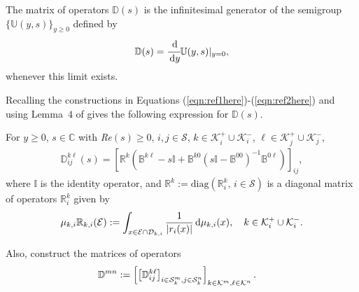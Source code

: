 The matrix of operators \(\mathbb D(s)\) is the infinitesimal generator of the semigroup \(\{\mathbb U(y,s)\}_{y\geq 0}\) defined by 
\[\mathbb D(s) = \cfrac{\, \mathrm{d}}{\, \mathrm{d} y}\mathbb U(y,s)|_{y=0},\]
whenever this limit exists.
			
	Recalling the constructions in Equations (\ref{eqn:ref1here})-(\ref{eqn:ref2here}) and using Lemma~$4$ of \cite{bo2014} gives the following expression for $\mathbb{D}(s)$. 
\begin{lem}\label{lemma: D(s)}
	For $y \geq 0$, $s \in \mathbb{C}$ with \textit{Re}$(s) \geq 0$, $i,j \in \mathcal{S}$, $k\in \mathcal K_i^+\cup\mathcal K_i^-$, $\ell\in \mathcal K_j^+\cup\mathcal K_j^-$,
	\begin{align*}
		\mathbb{D}_{ij}^{k\ell}(s) = [\mathbb{R}^{k}(
		\mathbb{B}^{k\ell } - s\mathbb{I} + \mathbb{B}^{k0 }(s \mathbb{I} - \mathbb{B}^{00})^{-1}\mathbb{B}^{0\ell})]_{ij}, 
	\end{align*} 
	where $\mathbb I$ is the identity operator, and $\mathbb{R}^{k} := \mathrm{diag}(\mathbb{R}_i^{k},\,i \in \mathcal{S})$ is a diagonal matrix of operators $\mathbb{R}_i^{k}$ given by 
	\begin{align*} 
		{\mu}_{k,i}\mathbb{R}_{k,i}(\mathcal{E}) := \int_{x \in \mathcal{E} \cap \mathcal{D}_{k,i}} \frac{1}{|r_i(x)|}\, \mathrm{d}  \mu_{k,i}(x),\quad k\in \mathcal K_i^+\cup\mathcal K_i^-.
	\end{align*} 
\end{lem}

	Also, construct the matrices of operators 
	\begin{align*}
		\mathbb D^{m n} &:= \left[\left[\mathbb D_{ij}^{k \ell}\right]_{i\in\mathcal{S}_k^m,j\in\mathcal{S}_k^n}\right]_{k\in\mathcal K^m,\ell\in\mathcal K^n}.
        \end{align*}

